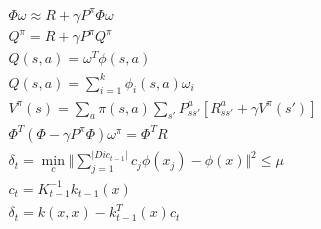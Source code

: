 \documentclass{article}
\begin{document}
\begin{align}
 \Phi \omega \approx R + \gamma  P^\pi  \Phi \omega\\ 
 Q^\pi = R + \gamma P^\pi Q^\pi \\
 Q(s, a) = \omega^T \phi (s, a) \\
 Q(s, a) = \sum_{i=1}^k \phi_i (s, a) \omega_i\\
 V^\pi(s) = \sum_a \pi(s, a) \sum_{s'} P_{ss'}^a [R_{ss'}^a + \gamma V^{\pi}(s')] \\
 \Phi^T ( \Phi - \gamma P^\pi \Phi) \omega^\pi = \Phi^T R \\
 \delta_t = \min_c \Vert \sum_{j=1}^{\vert Dic_{t-1} \vert} c_j\phi(x_j) - \phi(x) \Vert^2 \le \mu
\\
c_t = K_{t-1}^{-1} k_{t-1}(x) \\
\delta_t = k(x, x) - k_{t-1}^T(x) c_t
\end{align}
\end{document}

